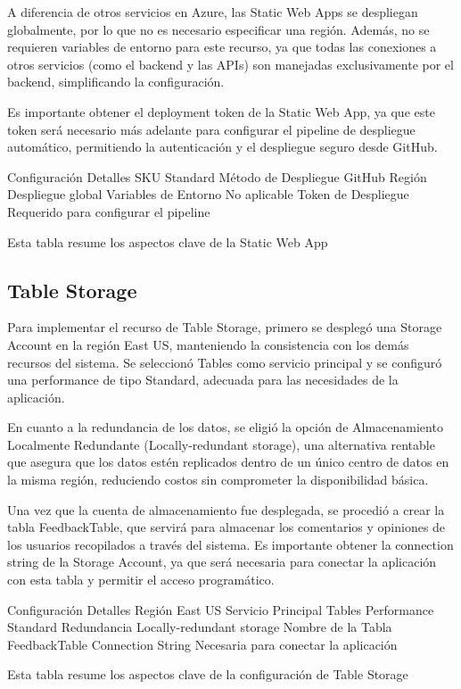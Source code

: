 A diferencia de otros servicios en Azure, las Static Web Apps se despliegan globalmente, por lo que no es necesario especificar una región. Además, no se requieren variables de entorno para este recurso, ya que todas las conexiones a otros servicios (como el backend y las APIs) son manejadas exclusivamente por el backend, simplificando la configuración.

Es importante obtener el deployment token de la Static Web App, ya que este token será necesario más adelante para configurar el pipeline de despliegue automático, permitiendo la autenticación y el despliegue seguro desde GitHub.

Configuración	Detalles
SKU	Standard
Método de Despliegue	GitHub
Región	Despliegue global
Variables de Entorno	No aplicable
Token de Despliegue	Requerido para configurar el pipeline

Esta tabla resume los aspectos clave de la Static Web App

\subsection{Table Storage}

Para implementar el recurso de Table Storage, primero se desplegó una Storage Account en la región East US, manteniendo la consistencia con los demás recursos del sistema. Se seleccionó Tables como servicio principal y se configuró una performance de tipo Standard, adecuada para las necesidades de la aplicación.

En cuanto a la redundancia de los datos, se eligió la opción de Almacenamiento Localmente Redundante (Locally-redundant storage), una alternativa rentable que asegura que los datos estén replicados dentro de un único centro de datos en la misma región, reduciendo costos sin comprometer la disponibilidad básica.

Una vez que la cuenta de almacenamiento fue desplegada, se procedió a crear la tabla FeedbackTable, que servirá para almacenar los comentarios y opiniones de los usuarios recopilados a través del sistema. Es importante obtener la connection string de la Storage Account, ya que será necesaria para conectar la aplicación con esta tabla y permitir el acceso programático.

Configuración	Detalles
Región	East US
Servicio Principal	Tables
Performance	Standard
Redundancia	Locally-redundant storage
Nombre de la Tabla	FeedbackTable
Connection String	Necesaria para conectar la aplicación

Esta tabla resume los aspectos clave de la configuración de Table Storage

